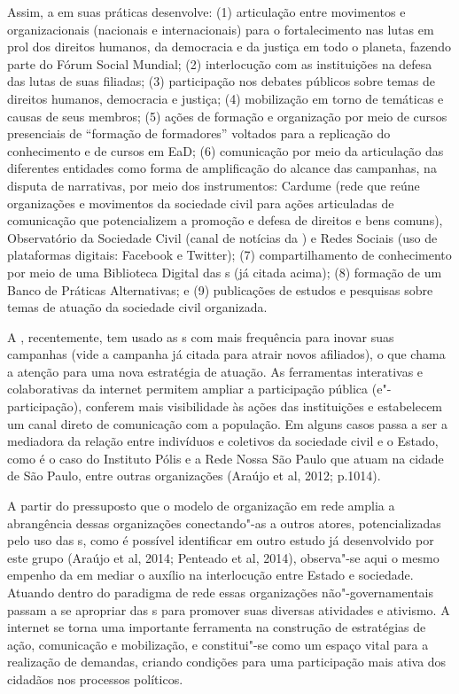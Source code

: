 Assim, a  em suas práticas desenvolve: (1) articulação entre
movimentos e organizacionais (nacionais e internacionais) para o
fortalecimento nas lutas em prol dos direitos humanos, da democracia e
da justiça em todo o planeta, fazendo parte do Fórum Social Mundial; (2)
interlocução com as instituições na defesa das lutas de suas filiadas;
(3) participação nos debates públicos sobre temas de direitos humanos,
democracia e justiça; (4) mobilização em torno de temáticas e causas de
seus membros; (5) ações de formação e organização por meio de cursos
presenciais de ``formação de formadores'' voltados para a replicação do
conhecimento e de cursos em EaD; (6) comunicação por meio da articulação
das diferentes entidades como forma de amplificação do alcance das
campanhas, na disputa de narrativas, por meio dos instrumentos: Cardume
(rede que reúne organizações e movimentos da sociedade civil para ações
articuladas de comunicação que potencializem a promoção e defesa de
direitos e bens comuns), Observatório da Sociedade Civil (canal de
notícias da ) e Redes Sociais (uso de plataformas digitais:
Facebook e Twitter); (7) compartilhamento de conhecimento por meio de
uma Biblioteca Digital das s (já citada acima); (8) formação de um
Banco de Práticas Alternativas; e (9) publicações de estudos e pesquisas
sobre temas de atuação da sociedade civil organizada.

A , recentemente, tem usado as s com mais frequência para inovar
suas campanhas (vide a campanha já citada para atrair novos afiliados),
o que chama a atenção para uma nova estratégia de atuação. As
ferramentas interativas e colaborativas da internet permitem ampliar a
participação pública (e"-participação), conferem mais visibilidade às
ações das instituições e estabelecem um canal direto de comunicação com
a população. Em alguns casos passa a ser a mediadora da relação entre
indivíduos e coletivos da sociedade civil e o Estado, como é o caso do
Instituto Pólis e a Rede Nossa São Paulo que atuam na cidade de São
Paulo, entre outras organizações (Araújo et al, 2012; p.1014).

A partir do pressuposto que o modelo de organização em rede amplia a
abrangência dessas organizações conectando"-as a outros atores,
potencializadas pelo uso das s, como é possível identificar em outro
estudo já desenvolvido por este grupo (Araújo et al, 2014; Penteado et
al, 2014), observa"-se aqui o mesmo empenho da  em mediar o auxílio
na interlocução entre Estado e sociedade. Atuando dentro do paradigma de
rede essas organizações não"-governamentais passam a se apropriar das
s para promover suas diversas atividades e ativismo. A internet se
torna uma importante ferramenta na construção de estratégias de ação,
comunicação e mobilização, e constitui"-se como um espaço vital para a
realização de demandas, criando condições para uma participação mais
ativa dos cidadãos nos processos políticos.

